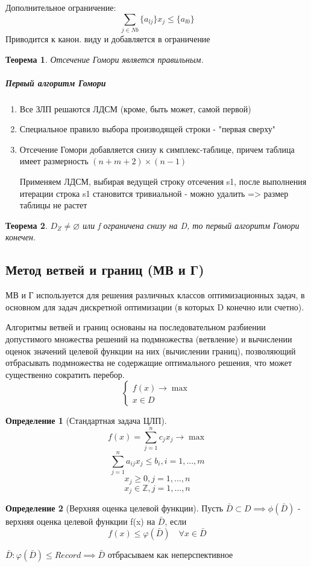 \documentclass[a4paper]{article}
\newtheorem{theorem}{Теорема}[section]
\theoremstyle{definition}
\newtheorem*{definition}{Определение}
\theoremstyle{remark}
\begin{document}
Дополнительное ограничение:
\[\sum_{j\in Nb} \{a_{lj}\}x_j \leq \{a_{l0}\}\]
Приводится к канон. виду и добавляется в ограничение
\begin{theorem}
    Отсечение Гомори является правильным.
\end{theorem}
\subparagraph*{Первый алгоритм Гомори}
\begin{enumerate}
    \item Все ЗЛП решаются ЛДСМ (кроме, быть может, самой первой)
    \item Специальное правило выбора производящей строки - "первая сверху"
    \item Отсечение Гомори добавляется снизу к симплекс-таблице, причем таблица имеет размерность $(n+m+2)\times(n-1)$
    
    Применяем ЛДСМ, выбирая ведущей строку отсечения s1, после выполнения итерации строка s1 становится тривиальной - можно удалить => размер таблицы не растет
\end{enumerate}
\begin{theorem}
    $D_Z\neq \varnothing$ или f ограничена снизу на D, то первый алгоритм Гомори конечен.
\end{theorem}
\subsection{Метод ветвей и границ (МВ и Г)}
МВ и Г используется для решения различных классов оптимизационных задач, в основном для задач дискретной оптимизации (в которых D конечно или счетно).

Алгоритмы ветвей и границ основаны на последовательном разбиении допустимого множества решений на подмножества (ветвление) и вычислении оценок значений целевой функции на них (вычислении границ), позволяющий отбрасывать подмножества не содержащие оптимального решения, что может существенно сократить перебор.
\[\begin{cases}
    f(x) \to \max \\
    x\in D
\end{cases}\]
\begin{definition}[Стандартная задача ЦЛП]
    \begin{equation}
        f(x) = \sum_{j=1}^n c_j x_j \to \max
    \end{equation}
 \begin{equation}
    \sum_{j = 1}^n a_{ij}x_j \le b_i, i = 1, \dots, m 
 \end{equation}
\begin{equation}
    x_j \ge 0, j = 1, \dots, n
\end{equation}
 \begin{equation}
    x_j \in \mathbb{Z}, j =1, \dots, n 
 \end{equation}

\end{definition}
\begin{definition}[Верхняя оценка целевой функции]
    Пусть $\bar{D} \subset D \implies \phi(\bar{D})$ - верхняя оценка целевой функции f(x) на $\bar{D}$, если \[f(x)\le \varphi(\bar{D}) \quad \forall x \in \bar{D}\]
\end{definition}
$\bar{D}: \varphi(\bar{D}) \le Record \implies \bar{D}$ отбрасываем как неперспективное
\end{document}
